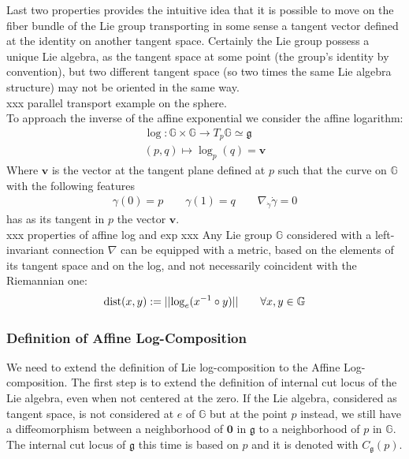 Last two properties provides the intuitive idea that it is possible to move on the fiber bundle of the Lie group transporting in some sense a tangent vector defined at the identity on another tangent space. Certainly the Lie group possess a unique Lie algebra, as the tangent space at some point (the group's identity by convention), but two different tangent space (so two times the same Lie algebra structure) may not be oriented in the same way. \\
xxx parallel transport example on the sphere.\\
To approach the inverse of the affine exponential we consider the affine logarithm:
\begin{align*}
\log :  \mathbb{G}  \times \mathbb{G}   \longrightarrow T_{p}\mathbb{G}   \simeq \mathfrak{g} 
\\ 
(p,q) \longmapsto \log_{p}(q)  = \mathbf{v} 
\end{align*}
Where $\mathbf{v} $ is the vector at the tangent plane defined at $p$ such that the curve on $\mathbb{G} $ with the following features
\begin{align*}
\gamma(0) = p\qquad  \gamma(1) = q \qquad \nabla_{\dot{\gamma}}\dot{\gamma} = 0 
\end{align*}
has as its tangent in $p$ the vector $\mathbf{v}$.\\
xxx properties of affine log and exp xxx
Any Lie group $\mathbb{G}$ considered with a left-invariant connection $\nabla$ can be equipped with a metric,  based on the elements of its tangent space and on the log, and not necessarily coincident with the Riemannian one:
\begin{align*} 
\text{dist}(x,y) := \vert\lvert \log_{e}(x^{-1}\circ y)  \rvert\vert \qquad \forall x, y \in \mathbb{G}
\end{align*}

\subsubsection{Definition of Affine Log-Composition}
We need to extend the definition of Lie log-composition to the Affine Log-composition. The first step is to extend the definition of internal cut locus of the Lie algebra, even when not centered at the zero. 
If the Lie algebra, considered as tangent space, is not considered at $e$ of $\mathbb{G}$ but at the point $p$ instead, we still have a diffeomorphism between a neighborhood of $\mathbf{0}$ in $\mathfrak{g}$ to a neighborhood of $p$ in $\mathbb{G}$. The internal cut locus of $\mathfrak{g}$ this time is based on $p$ and it is denoted with $C_{\mathfrak{g}}(p)$.

